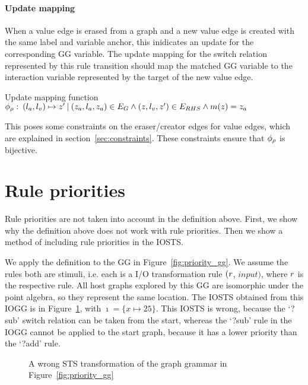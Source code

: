 \paragraph*{Update mapping}\label{sec:updates}
When a value edge is erased from a graph and a new value edge is created with the same label and variable anchor, this inidicates an update for the corresponding GG variable. The update mapping for the switch relation represented by this rule transition should map the matched GG variable to the interaction variable represented by the target of the new value edge.
\vspace{10px}\begin{definition} Update mapping function
\vspace{2px} \\
$\phi_{\rho}:\: (l_a, l_v) \mapsto z'\: |\: (z_a, l_a, z_a) \in E_{G} \land (z, l_v, z') \in E_{RHS} \land m(z) = z_a$
\end{definition}
\vspace{10px}
This poses some constraints on the eraser/creator edges for value edges, which are explained in section~\ref{sec:constraints}. These constraints ensure that $\phi_{\rho}$ is bijective.

\section{Rule priorities}
Rule priorities are not taken into account in the definition above. First, we show why the definition above does not work with rule priorities. Then we show a method of including rule priorities in the IOSTS.

We apply the definition to the GG in Figure~\ref{fig:priority_gg}. We assume the rules both are stimuli, i.e. each is a I/O transformation rule $(r$, $\mathit{input})$, where $r$ is the respective rule. All host graphs explored by this GG are isomorphic under the point algebra, so they represent the same location. The IOSTS obtained from this IOGG is in Figure~\ref{fig:priority_sts_wrong}, with $\imath = \{x \mapsto 25\}$. This IOSTS is wrong, because the `?sub' switch relation can be taken from the start, whereas the `?sub' rule in the IOGG cannot be applied to the start graph, because it has a lower priority than the `?add' rule.

\begin{figure}[ht]
  \begin{center}
    
  \end{center}
  \caption{A wrong STS transformation of the graph grammar in Figure~\ref{fig:priority_gg}}
  \label{fig:priority_sts_wrong}
\end{figure}


